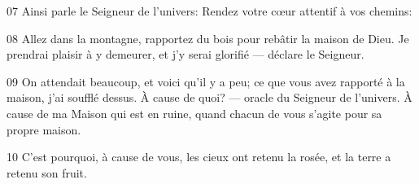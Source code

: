 
07 Ainsi parle le Seigneur de l’univers: Rendez votre cœur attentif à vos chemins:

08 Allez dans la montagne, rapportez du bois pour rebâtir la maison de Dieu. Je prendrai plaisir à y demeurer, et j’y serai glorifié --- déclare le Seigneur.

09 On attendait beaucoup, et voici qu’il y a peu; ce que vous avez rapporté à la maison, j’ai soufflé dessus. À cause de quoi? --- oracle du Seigneur de l’univers. À cause de ma Maison qui est en ruine, quand chacun de vous s’agite pour sa propre maison.

10 C’est pourquoi, à cause de vous, les cieux ont retenu la rosée, et la terre a retenu son fruit.